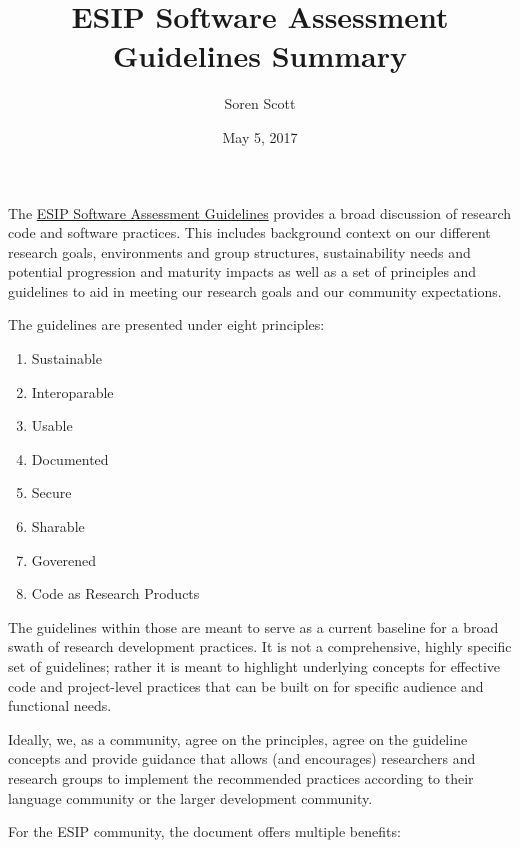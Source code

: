 \documentclass{article}
\title{ESIP Software Assessment Guidelines Summary}
\author{Soren Scott}
\date {May 5, 2017}
\begin{document}
\maketitle

The \href{https://esipfed.github.io/Software-Assessment-Guidelines/guidelines.html} {ESIP Software Assessment Guidelines} provides a broad discussion of research code and software practices. This includes background context on our different research goals, environments and group structures, sustainability needs and potential progression and maturity impacts as well as a set of principles and guidelines to aid in meeting our research goals and our community expectations.  
 
The guidelines are presented under eight principles:
\begin{enumerate}
\item Sustainable
\item Interoparable
\item Usable
\item Documented
\item Secure
\item Sharable
\item Goverened
\item Code as Research Products
\end{enumerate}

The guidelines within those are meant to serve as a current baseline for a broad swath of research development practices. It is not a comprehensive, highly specific set of guidelines; rather it is meant to highlight underlying concepts for effective code and project-level practices that can be built on for specific audience and functional needs. 
 
Ideally, we, as a community, agree on the principles, agree on the guideline concepts and provide guidance that allows (and encourages) researchers and research groups to implement the recommended practices according to their language community or the larger development community. 

For the ESIP community, the document offers multiple benefits:
\end{document}
